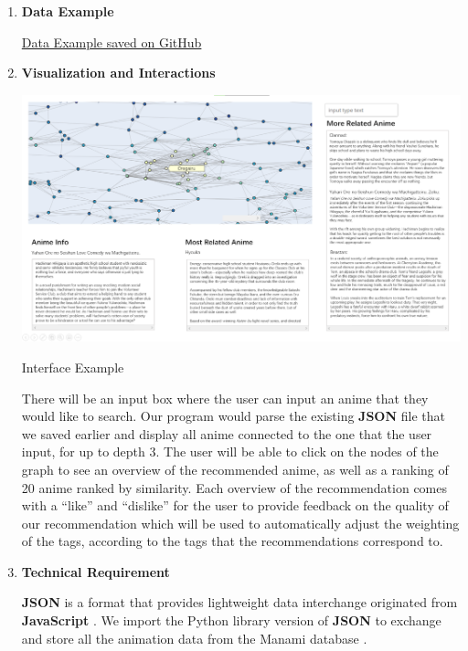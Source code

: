 \documentclass[fontsize=11pt]{article}
\begin{document}
\begin{enumerate}
    \item \textbf{Data Example}
    
    \href{https://gist.github.com/RealFakeAccount/cf34244d17039e78512428a1cf51d95f}{Data Example saved on GitHub} \citep{manami}
    
    \item \textbf{Visualization and Interactions}
    
    \begin{center}
        \includegraphics[scale=.2]{Interface Example.png}
        
        Interface Example
    \end{center}
    
    \quad There will be an input box where the user can input an anime that they would like to search. Our program would parse the existing \textbf{JSON} file that we saved earlier and display all anime connected to the one that the user input, for up to depth 3. The user will be able to click on the nodes of the graph to see an overview of the recommended anime, as well as a ranking of 20 anime ranked by similarity. Each overview of the recommendation comes with a “like” and “dislike” for the user to provide feedback on the quality of our recommendation which will be used to automatically adjust the weighting of the tags, according to the tags that the recommendations correspond to.
    
    \item \textbf{Technical Requirement}
    
    \quad \textbf{JSON} is a format that provides lightweight data interchange originated from \textbf{JavaScript} \citep{JSON21}. We import the Python library version of \textbf{JSON} to exchange and store all the animation data from the Manami database \citep{Pyjson}. 


\end{enumerate}
\end{document}
